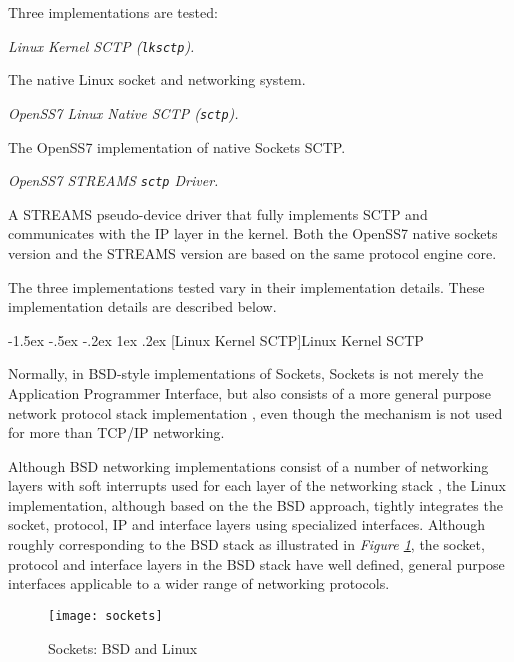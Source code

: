\documentclass[letterpaper,final,notitlepage,twocolumn,10pt,twoside]{article}
\makeatletter
\renewcommand\subsection{\@startsection{subsection}{2}{\z@}%
                                     {-1.5ex \@plus -.5ex \@minus -.2ex}%
                                     {1ex \@plus .2ex}%
                                     {\normalfont\normalsize\bfseries}}
\makeatother
\begin{document}
Three implementations are tested:

\begin{description}

\item {\it Linux Kernel SCTP ({\tt lksctp}).}

The native Linux socket and networking system.

\item {\it OpenSS7 Linux Native SCTP ({\tt sctp}).}

The OpenSS7 implementation of native Sockets SCTP.

\item {\it OpenSS7 STREAMS {\tt sctp} Driver.}

A STREAMS pseudo-device driver that fully implements SCTP and communicates with the IP layer in the
kernel.  Both the OpenSS7 native sockets version and the STREAMS version are based on the same
protocol engine core.

\end{description}

The three implementations tested vary in their implementation details.  These
implementation details are described below.

\subsection[Linux Kernel SCTP]{Linux Kernel SCTP}

Normally, in BSD-style implementations of Sockets, Sockets is not merely the
Application Programmer Interface, but also consists of a more general purpose
network protocol stack implementation \cite[]{bsd}, even though the mechanism
is not used for more than TCP/IP networking.  \cite[]{magic}

Although BSD networking implementations consist of a number of networking
layers with soft interrupts used for each layer of the networking stack
\cite[]{bsd}, the Linux implementation, although based on the the BSD
approach, tightly integrates the socket, protocol, IP and interface layers
using specialized interfaces.  Although roughly corresponding to the BSD stack
as illustrated in \textit{Figure \ref{figure:sockets}}, the socket, protocol
and interface layers in the BSD stack have well defined, general purpose
interfaces applicable to a wider range of networking protocols.

\begin{figure}[htp]
\center\texttt{[image: sockets]}
\caption[Sockets: BSD and Linux]{Sockets: BSD and Linux}
\label{figure:sockets}
\end{figure}
\end{document}
